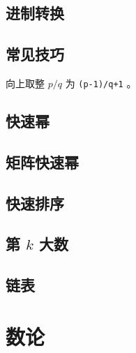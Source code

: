 \documentclass[cn,11pt,blue,normal,founder]{elegantbook}
\begin{document}
\section{进制转换}



\section{常见技巧}

向上取整 $p/q$ 为 \lstinline[style=cpp]{(p-1)/q+1} 。

%


%

\section{快速幂} %



\section{矩阵快速幂}



\section{快速排序}



\section{第 $k$ 大数}



\section{链表}




\chapter{数论}
\end{document}
